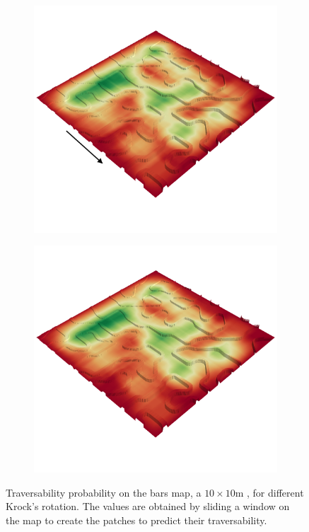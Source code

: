 \documentclass[../document.tex]{subfiles}
\begin{document}
\begin{figure} [htbp]
\begin{subfigure}[b]{0.45\textwidth}
  \end{subfigure}
  \begin{subfigure}[b]{0.45\textwidth}
    \includegraphics[width=\linewidth]{../img/4/traversability/bars/-0.png}
  \end{subfigure}
  \begin{subfigure}[b]{0.45\textwidth}
      \includegraphics[width=\linewidth]{../img/4/traversability/bars/-180.png}  
  \end{subfigure}
  \caption{Traversability probability on the bars map, a $10\times 10$m , for different Krock's rotation. The values are obtained by sliding a window on the map to create the patches to predict their traversability.}
  \label{fig : bars-trav}
  \end{figure}
\end{document}
